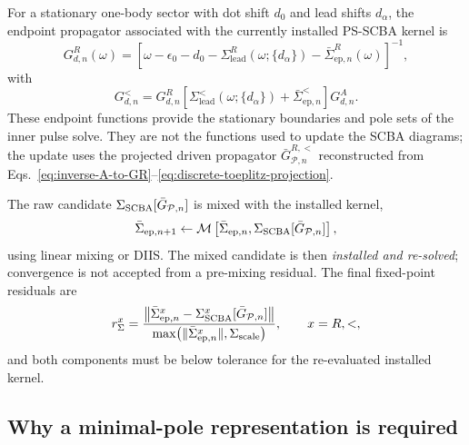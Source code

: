 \documentclass[
 reprint,
 superscriptaddress,
 amsmath,amssymb,
 aps,prb,
 longbibliography,
 floatfix
]{revtex4-2}
\newcommand{\ep}{\mathrm{ep}}
\newcommand{\lead}{\mathrm{lead}}
\begin{document}
For a stationary one-body sector with dot shift \(d_0\) and lead shifts \(d_\alpha\), the endpoint propagator associated with the currently installed PS-SCBA kernel is
\begin{equation}
G_{d,n}^{R}(\omega)
=
\left[
\omega-\epsilon_0-d_0
-
\Sigma_{\lead}^{R}(\omega;\{d_\alpha\})
-
\bar\Sigma_{\ep,n}^{R}(\omega)
\right]^{-1},
\label{eq:dot-stationary-scba}
\end{equation}
with
\begin{equation*}
G_{d,n}^{<}
=
G_{d,n}^{R}
\left[
\Sigma_{\lead}^{<}(\omega;\{d_\alpha\})
+
\bar\Sigma_{\ep,n}^{<}
\right]
G_{d,n}^{A}.
\end{equation*}
These endpoint functions provide the stationary boundaries and pole sets of the inner pulse solve. They are not the functions used to update the SCBA diagrams; the update uses the projected driven propagator \(\bar G_{\mathcal P,n}^{R,<}\) reconstructed from Eqs.~\eqref{eq:inverse-A-to-GR}--\eqref{eq:discrete-toeplitz-projection}.

The raw candidate \(\Sigma_{\rm SCBA}[\bar G_{\mathcal P,n}]\) is mixed with the installed kernel,
\begin{equation*}
\bar\Sigma_{\ep,n+1}
\leftarrow
\mathcal M
\left[
\bar\Sigma_{\ep,n},
\Sigma_{\rm SCBA}[\bar G_{\mathcal P,n}]
\right],
\end{equation*}
using linear mixing or DIIS. The mixed candidate is then \emph{installed and re-solved}; convergence is not accepted from a pre-mixing residual. The final fixed-point residuals are
\begin{equation}
r_{\Sigma}^{x}
=
\frac{
\left\|
\bar\Sigma_{\ep,n}^{x}
-
\Sigma_{\rm SCBA}^{x}
[\bar G_{\mathcal P,n}]
\right\|
}{
\max\!\left(
\|\bar\Sigma_{\ep,n}^{x}\|,
\Sigma_{\rm scale}
\right)
},
\qquad
x=R,<,
\label{eq:psscba-residual}
\end{equation}
and both components must be below tolerance for the re-evaluated installed kernel.

\subsection{Why a minimal-pole representation is required}
\label{sec:mpm-dot}
\end{document}
